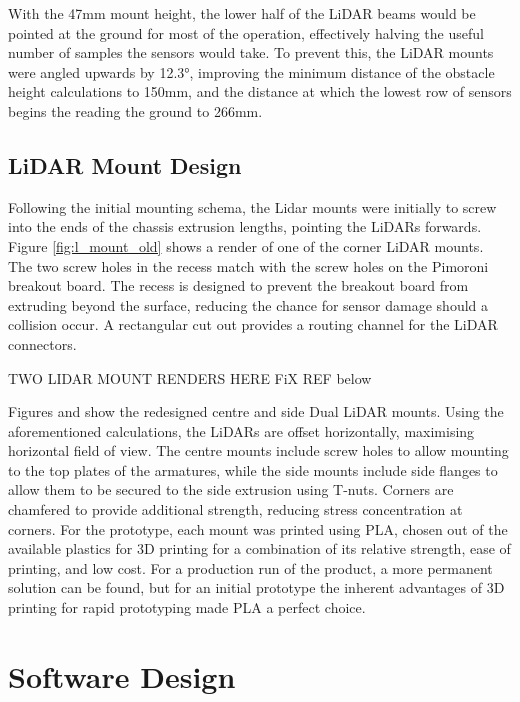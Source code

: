 \documentclass [12pt]{article}
\begin{document}
With the 47mm mount height, the lower half of the LiDAR beams would be pointed at the ground for most of the operation, effectively halving the useful number of samples the sensors would take. To prevent this, the LiDAR mounts were angled upwards by 12.3°,  improving the minimum distance of the obstacle height calculations to 150mm, and the distance at which the lowest row of sensors begins the reading the ground to 266mm.
\subsection{LiDAR Mount Design}


Following the initial mounting schema, the Lidar mounts were initially to screw into the ends of the chassis extrusion lengths, pointing the LiDARs forwards. Figure \ref{fig:l_mount_old} shows a render of one of the corner LiDAR mounts. The two screw holes in the recess match with the screw holes on the Pimoroni breakout board. The recess is designed to prevent the breakout board from extruding beyond the surface, reducing the chance for sensor damage should a collision occur. A rectangular cut out provides a routing channel for the LiDAR connectors.

TWO LIDAR MOUNT RENDERS HERE FiX REF below

Figures  and  show the redesigned centre and side Dual LiDAR mounts. Using the aforementioned calculations, the LiDARs are offset horizontally, maximising horizontal field of view. The centre mounts include screw holes to allow mounting to the top plates of the armatures, while the side mounts include side flanges to allow them to be secured to the side extrusion using T-nuts. Corners are chamfered to provide additional strength, reducing stress concentration at corners\cite{BELINGARDI2002273}.
For the prototype, each mount was printed using PLA, chosen out of the available plastics for 3D printing for a combination of its relative strength, ease of printing, and low cost. For a production run of the product, a more permanent solution can be found, but for an initial prototype the inherent advantages of 3D printing for rapid prototyping made PLA a perfect choice.


\newpage
\section{Software Design}
\end{document}
